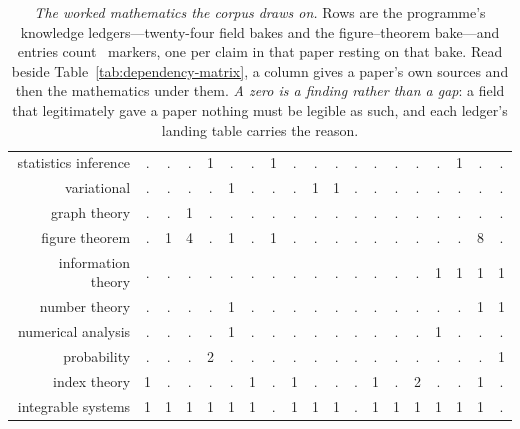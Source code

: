 \documentclass[11pt,a4paper]{article}
\theoremstyle{plain}
\theoremstyle{definition}
\theoremstyle{remark}
\begin{document}
\begin{table}[ht]
{\begin{tabular}{r|cccccccccccccccccc}
\textsf{statistics inference} & . & . & . & 1 & . & . & 1 & . & . & . & . & . & . & . & . & 1 & . & .\\
\textsf{variational} & . & . & . & . & 1 & . & . & . & 1 & 1 & . & . & . & . & . & . & . & .\\
\textsf{graph theory} & . & . & 1 & . & . & . & . & . & . & . & . & . & . & . & . & . & . & .\\
\textsf{figure theorem} & . & 1 & 4 & . & 1 & . & 1 & . & . & . & . & . & . & . & . & . & 8 & .\\
\textsf{information theory} & . & . & . & . & . & . & . & . & . & . & . & . & . & . & 1 & 1 & 1 & 1\\
\textsf{number theory} & . & . & . & . & 1 & . & . & . & . & . & . & . & . & . & . & . & 1 & 1\\
\textsf{numerical analysis} & . & . & . & . & 1 & . & . & . & . & . & . & . & . & . & 1 & . & . & .\\
\textsf{probability} & . & . & . & 2 & . & . & . & . & . & . & . & . & . & . & . & . & . & 1\\
\textsf{index theory} & 1 & . & . & . & . & 1 & . & 1 & . & . & . & 1 & . & 2 & . & . & 1 & .\\
\textsf{integrable systems} & 1 & 1 & 1 & 1 & 1 & 1 & . & 1 & 1 & 1 & . & 1 & 1 & 1 & 1 & 1 & 1 & .\\
\end{tabular}}
\caption{\emph{The worked mathematics the corpus draws on.} Rows are the programme's knowledge ledgers---twenty-four field bakes and the figure--theorem bake---and entries count \ldgmarker\ markers, one per claim in that paper resting on that bake. Read beside Table~\ref{tab:dependency-matrix}, a column gives a paper's own sources and then the mathematics under them. \emph{A zero is a finding rather than a gap}: a field that legitimately gave a paper nothing must be legible as such, and each ledger's landing table carries the reason.}
\label{tab:ledger-block}
\end{table}
\end{document}
